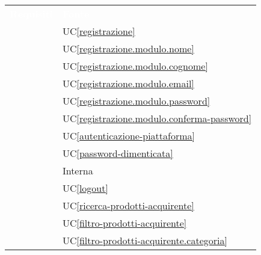 \renewcommand{\arraystretch}{1.5}


\begin{longtable}{C{6cm} C{6cm}} 
	
	\textcolor{white}{\textbf{Requisiti}} &
	\textcolor{white}{\textbf{Fonte}} \\

     & UC\ref{registrazione} \\ 

     & UC\ref{registrazione.modulo.nome} \\

     & UC\ref{registrazione.modulo.cognome} \\

     & UC\ref{registrazione.modulo.email} \\

     & UC\ref{registrazione.modulo.password} \\

     & UC\ref{registrazione.modulo.conferma-password} \\

     & UC\ref{autenticazione-piattaforma} \\

     & UC\ref{password-dimenticata} \\

     & Interna \\

     & UC\ref{logout} \\

     & UC\ref{ricerca-prodotti-acquirente} \\

     & UC\ref{filtro-prodotti-acquirente} \\

     & UC\ref{filtro-prodotti-acquirente.categoria} \\


\end{longtable}
